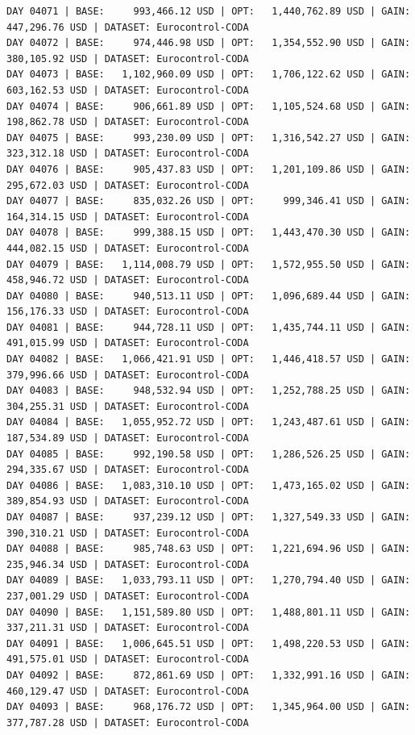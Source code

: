 \documentclass[11pt,a4paper]{article}
\begin{document}
\begin{verbatim}
DAY 04071 | BASE:     993,466.12 USD | OPT:   1,440,762.89 USD | GAIN: 447,296.76 USD | DATASET: Eurocontrol-CODA
DAY 04072 | BASE:     974,446.98 USD | OPT:   1,354,552.90 USD | GAIN: 380,105.92 USD | DATASET: Eurocontrol-CODA
DAY 04073 | BASE:   1,102,960.09 USD | OPT:   1,706,122.62 USD | GAIN: 603,162.53 USD | DATASET: Eurocontrol-CODA
DAY 04074 | BASE:     906,661.89 USD | OPT:   1,105,524.68 USD | GAIN: 198,862.78 USD | DATASET: Eurocontrol-CODA
DAY 04075 | BASE:     993,230.09 USD | OPT:   1,316,542.27 USD | GAIN: 323,312.18 USD | DATASET: Eurocontrol-CODA
DAY 04076 | BASE:     905,437.83 USD | OPT:   1,201,109.86 USD | GAIN: 295,672.03 USD | DATASET: Eurocontrol-CODA
DAY 04077 | BASE:     835,032.26 USD | OPT:     999,346.41 USD | GAIN: 164,314.15 USD | DATASET: Eurocontrol-CODA
DAY 04078 | BASE:     999,388.15 USD | OPT:   1,443,470.30 USD | GAIN: 444,082.15 USD | DATASET: Eurocontrol-CODA
DAY 04079 | BASE:   1,114,008.79 USD | OPT:   1,572,955.50 USD | GAIN: 458,946.72 USD | DATASET: Eurocontrol-CODA
DAY 04080 | BASE:     940,513.11 USD | OPT:   1,096,689.44 USD | GAIN: 156,176.33 USD | DATASET: Eurocontrol-CODA
DAY 04081 | BASE:     944,728.11 USD | OPT:   1,435,744.11 USD | GAIN: 491,015.99 USD | DATASET: Eurocontrol-CODA
DAY 04082 | BASE:   1,066,421.91 USD | OPT:   1,446,418.57 USD | GAIN: 379,996.66 USD | DATASET: Eurocontrol-CODA
DAY 04083 | BASE:     948,532.94 USD | OPT:   1,252,788.25 USD | GAIN: 304,255.31 USD | DATASET: Eurocontrol-CODA
DAY 04084 | BASE:   1,055,952.72 USD | OPT:   1,243,487.61 USD | GAIN: 187,534.89 USD | DATASET: Eurocontrol-CODA
DAY 04085 | BASE:     992,190.58 USD | OPT:   1,286,526.25 USD | GAIN: 294,335.67 USD | DATASET: Eurocontrol-CODA
DAY 04086 | BASE:   1,083,310.10 USD | OPT:   1,473,165.02 USD | GAIN: 389,854.93 USD | DATASET: Eurocontrol-CODA
DAY 04087 | BASE:     937,239.12 USD | OPT:   1,327,549.33 USD | GAIN: 390,310.21 USD | DATASET: Eurocontrol-CODA
DAY 04088 | BASE:     985,748.63 USD | OPT:   1,221,694.96 USD | GAIN: 235,946.34 USD | DATASET: Eurocontrol-CODA
DAY 04089 | BASE:   1,033,793.11 USD | OPT:   1,270,794.40 USD | GAIN: 237,001.29 USD | DATASET: Eurocontrol-CODA
DAY 04090 | BASE:   1,151,589.80 USD | OPT:   1,488,801.11 USD | GAIN: 337,211.31 USD | DATASET: Eurocontrol-CODA
DAY 04091 | BASE:   1,006,645.51 USD | OPT:   1,498,220.53 USD | GAIN: 491,575.01 USD | DATASET: Eurocontrol-CODA
DAY 04092 | BASE:     872,861.69 USD | OPT:   1,332,991.16 USD | GAIN: 460,129.47 USD | DATASET: Eurocontrol-CODA
DAY 04093 | BASE:     968,176.72 USD | OPT:   1,345,964.00 USD | GAIN: 377,787.28 USD | DATASET: Eurocontrol-CODA

\end{verbatim}
\end{document}
